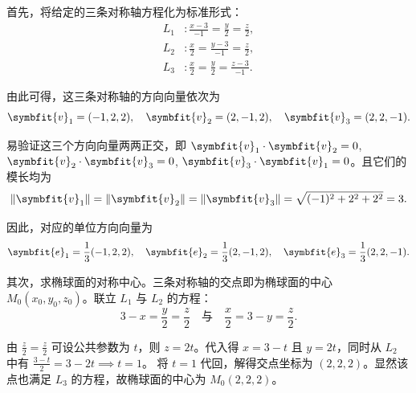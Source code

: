 \begin{solution}
    首先，将给定的三条对称轴方程化为标准形式：
    \begin{equation*}
        \begin{aligned}
            L_1 & \colon \frac{x - 3}{-1} = \frac{y}{2} = \frac{z}{2}, \\
            L_2 & \colon \frac{x}{2} = \frac{y - 3}{-1} = \frac{z}{2}, \\
            L_3 & \colon \frac{x}{2} = \frac{y}{2} = \frac{z - 3}{-1}.
        \end{aligned}
    \end{equation*}

    由此可得，这三条对称轴的方向向量依次为
    \begin{equation*}
        \symbfit{v}_1 = (-1, 2, 2), \quad \symbfit{v}_2 = (2, -1, 2), \quad \symbfit{v}_3 = (2, 2, -1).
    \end{equation*}

    易验证这三个方向向量两两正交，即 $\symbfit{v}_1 \cdot \symbfit{v}_2 = 0$, $\symbfit{v}_2 \cdot \symbfit{v}_3 = 0$, $\symbfit{v}_3 \cdot \symbfit{v}_1 = 0$。且它们的模长均为
    \begin{equation*}
        \|\symbfit{v}_1\| = \|\symbfit{v}_2\| = \|\symbfit{v}_3\| = \sqrt{(-1)^2 + 2^2 + 2^2} = 3.
    \end{equation*}

    因此，对应的单位方向向量为
    \begin{equation*}
        \symbfit{e}_1 = \frac{1}{3}(-1, 2, 2), \quad \symbfit{e}_2 = \frac{1}{3}(2, -1, 2), \quad \symbfit{e}_3 = \frac{1}{3}(2, 2, -1).
    \end{equation*}

    其次，求椭球面的对称中心。三条对称轴的交点即为椭球面的中心 $M_0(x_0, y_0, z_0)$。联立 $L_1$ 与 $L_2$ 的方程：
    \begin{equation*}
        3 - x = \frac{y}{2} = \frac{z}{2} \quad \text{与} \quad \frac{x}{2} = 3 - y = \frac{z}{2}.
    \end{equation*}

    由 $\frac{z}{2} = \frac{z}{2}$ 可设公共参数为 $t$，则 $z = 2t$。代入得 $x = 3 - t$ 且 $y = 2t$，同时从 $L_2$ 中有 $\frac{3 - t}{2} = 3 - 2t \implies t = 1$。
    将 $t = 1$ 代回，解得交点坐标为 $(2, 2, 2)$。显然该点也满足 $L_3$ 的方程，故椭球面的中心为 $M_0(2, 2, 2)$。


\end{solution}
